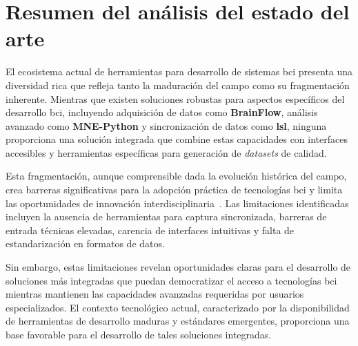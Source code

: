 \section{Resumen del análisis del estado del arte}
\label{sec:resumen_estado_arte}

El ecosistema actual de herramientas para desarrollo de sistemas \acrshort{bci} presenta una diversidad rica que refleja tanto la maduración del campo como su fragmentación inherente. Mientras que existen soluciones robustas para aspectos específicos del desarrollo \acrshort{bci}, incluyendo adquisición de datos como \textbf{BrainFlow}, análisis avanzado como \textbf{MNE-Python} y sincronización de datos como \textbf{\acrshort{lsl}}, ninguna proporciona una solución integrada que combine estas capacidades con interfaces accesibles y herramientas específicas para generación de \textit{\glspl{dataset}} de calidad.

Esta fragmentación, aunque comprensible dada la evolución histórica del campo, crea barreras significativas para la adopción práctica de tecnologías \acrshort{bci} y limita las oportunidades de innovación interdisciplinaria~\cite{chavarriaga2017heading,brunner2013bnci}. Las limitaciones identificadas incluyen la ausencia de herramientas para captura sincronizada, barreras de entrada técnicas elevadas, carencia de interfaces intuitivas y falta de estandarización en formatos de datos.

Sin embargo, estas limitaciones revelan oportunidades claras para el desarrollo de soluciones más integradas que puedan democratizar el acceso a tecnologías \acrshort{bci} mientras mantienen las capacidades avanzadas requeridas por usuarios especializados. El contexto tecnológico actual, caracterizado por la disponibilidad de herramientas de desarrollo maduras y estándares emergentes, proporciona una base favorable para el desarrollo de tales soluciones integradas.